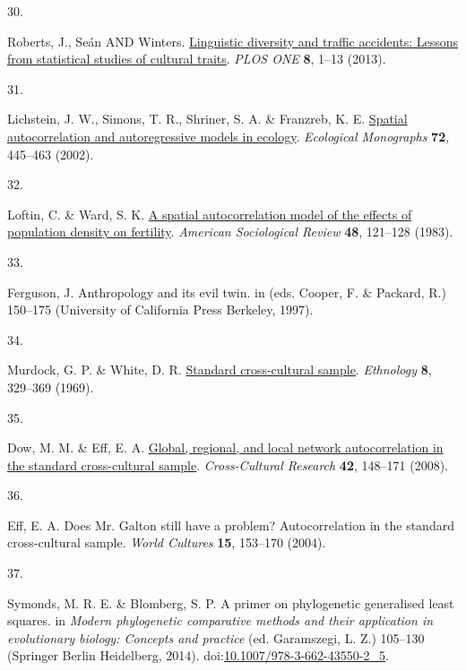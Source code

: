 \documentclass[
  man,floatsintext]{apa6}
\newlength{\cslhangindent}
\newlength{\csllabelwidth}
\newlength{\cslentryspacingunit} %
\newenvironment{CSLReferences}[2] %
 {%
  \setlength{\parindent}{0pt}
  \ifodd #1
  \let\oldpar\par
  \def\par{\hangindent=\cslhangindent\oldpar}
  \fi
  \setlength{\parskip}{#2\cslentryspacingunit}
 }%
 {}
\newcommand{\CSLLeftMargin}[1]{\parbox[t]{\csllabelwidth}{#1}}
\newcommand{\CSLRightInline}[1]{\parbox[t]{\linewidth - \csllabelwidth}{#1}\break}
\begin{document}
\begin{CSLReferences}{0}{0}
\leavevmode{}%
\CSLLeftMargin{30. }%
\CSLRightInline{Roberts, J., Seán AND Winters. \href{https://doi.org/10.1371/journal.pone.0070902}{Linguistic diversity and traffic accidents: Lessons from statistical studies of cultural traits}. \emph{PLOS ONE} \textbf{8}, 1--13 (2013).}

\leavevmode{}%
\CSLLeftMargin{31. }%
\CSLRightInline{Lichstein, J. W., Simons, T. R., Shriner, S. A. \& Franzreb, K. E. \href{https://doi.org/10.1890/0012-9615(2002)072\%5B0445:SAAAMI\%5D2.0.CO;2}{Spatial autocorrelation and autoregressive models in ecology}. \emph{Ecological Monographs} \textbf{72}, 445--463 (2002).}

\leavevmode{}%
\CSLLeftMargin{32. }%
\CSLRightInline{Loftin, C. \& Ward, S. K. \href{https://doi.org/10.2307/2095150}{A spatial autocorrelation model of the effects of population density on fertility}. \emph{American Sociological Review} \textbf{48}, 121--128 (1983).}

\leavevmode{}%
\CSLLeftMargin{33. }%
\CSLRightInline{Ferguson, J. Anthropology and its evil twin. in (eds. Cooper, F. \& Packard, R.) 150--175 (University of California Press Berkeley, 1997).}

\leavevmode{}%
\CSLLeftMargin{34. }%
\CSLRightInline{Murdock, G. P. \& White, D. R. \href{https://doi.org/10.2307/3772907}{Standard cross-cultural sample}. \emph{Ethnology} \textbf{8}, 329--369 (1969).}

\leavevmode{}%
\CSLLeftMargin{35. }%
\CSLRightInline{Dow, M. M. \& Eff, E. A. \href{https://doi.org/10.1177/1069397107311186}{Global, regional, and local network autocorrelation in the standard cross-cultural sample}. \emph{Cross-Cultural Research} \textbf{42}, 148--171 (2008).}

\leavevmode{}%
\CSLLeftMargin{36. }%
\CSLRightInline{Eff, E. A. Does {M}r. {G}alton still have a problem? Autocorrelation in the standard cross-cultural sample. \emph{World Cultures} \textbf{15}, 153--170 (2004).}

\leavevmode{}%
\CSLLeftMargin{37. }%
\CSLRightInline{Symonds, M. R. E. \& Blomberg, S. P. A primer on phylogenetic generalised least squares. in \emph{Modern phylogenetic comparative methods and their application in evolutionary biology: Concepts and practice} (ed. Garamszegi, L. Z.) 105--130 (Springer Berlin Heidelberg, 2014). doi:\href{https://doi.org/10.1007/978-3-662-43550-2_5}{10.1007/978-3-662-43550-2\_5}.}


\end{CSLReferences}
\end{document}
